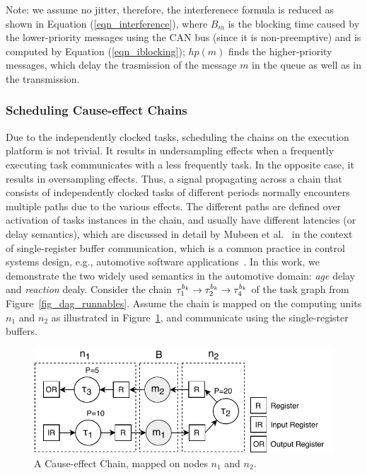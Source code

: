 {Note: we assume no jitter, therefore, the interferenece formula is reduced as shown in Equation (\ref{eqn_interference}), where $B_m$ is the blocking time caused by the lower-priority messages using the CAN bus (since it is non-preemptive) and is computed by Equation (\ref{eqn_iblocking}); $hp(m)$ finds the higher-priority messages, which delay the trasmission of the message $m$ in the queue as well as in the transmission.

\subsubsection{Scheduling Cause-effect Chains}\label{subsec_cause-effect_chains}
Due to the independently clocked tasks, scheduling the chains on the execution platform is not trivial. It results in undersampling effects when a frequently executing task communicates with a less frequently task. In the opposite case, it results in oversampling effects. Thus, a signal propagating across a chain that consists of independently clocked tasks of different periods normally encounters multiple paths due to the various effects. The different paths are defined over activation of tasks instances in the chain, and usually have different latencies (or delay semantics), which are discussed in detail by Mubeen et al.~\cite{mubeen2013support} in the context of single-register buffer communication,  which is a common practice in control systems design, e.g., automotive software applications~\cite{Becker2017End-to-endSystems}. In this work, we demonstrate the two widely used semantics in the automotive domain: \textit{age} delay and \textit{reaction} dealy. Consider the chain $\sss{\tau}[k][1][b]\rightarrow \sss{\tau}[k][2][b]\rightarrow \sss{\tau}[k][4][b]$ of the task graph \ttat[1] from Figure~\ref{fig_dag_runnables}. Assume the chain is mapped on the computing units $n_1$ and $n_2$ as illustrated in Figure~\ref{fig_cause_effect_chain}, and communicate using the single-register buffers.
\begin{figure}
	\centering
	\includegraphics[width=0.7\linewidth]{img/cause_effect_chain_ntk}
	\caption{A Cause-effect Chain, mapped on nodes $n_1$ and $n_2$.}
	\label{fig_cause_effect_chain}
\end{figure}

}
